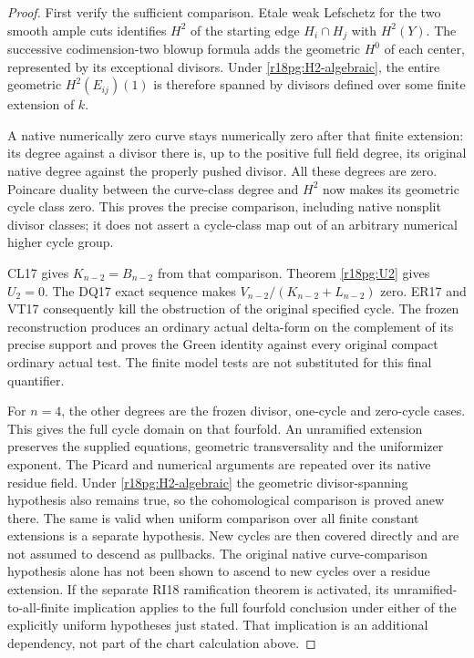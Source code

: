 \begin{proof}
First verify the sufficient comparison.  Etale weak Lefschetz for
the two smooth ample cuts identifies $H^2$ of the starting edge
$H_i\cap H_j$ with $H^2(Y)$.  The successive codimension-two
blowup formula adds the geometric $H^0$ of each center, represented
by its exceptional divisors.  Under \eqref{r18pg:H2-algebraic},
the entire geometric $H^2(E_{ij})(1)$ is therefore spanned by
divisors defined over some finite extension of $k$.

A native numerically zero curve stays numerically zero after that
finite extension: its degree against a divisor there is, up to the
positive full field degree, its original native degree against the
properly pushed divisor.  All these degrees are zero.  Poincare
duality between the curve-class degree and $H^2$ now makes its
geometric cycle class zero.  This proves the precise comparison,
including native nonsplit divisor classes; it does not assert a
cycle-class map out of an arbitrary numerical higher cycle group.

CL17 gives $K_{n-2}=B_{n-2}$ from that comparison.  Theorem
\ref{r18pg:U2} gives $U_2=0$.  The DQ17 exact sequence makes
$V_{n-2}/(K_{n-2}+L_{n-2})$ zero.  ER17 and VT17 consequently
kill the obstruction of the original specified cycle.  The frozen
reconstruction produces an ordinary actual delta-form on the
complement of its precise support and proves the Green identity
against every original compact ordinary actual test.  The finite
model tests are not substituted for this final quantifier.

For $n=4$, the other degrees are the frozen divisor, one-cycle and
zero-cycle cases.  This gives the full cycle domain on that fourfold.
An unramified extension preserves the supplied equations, geometric
transversality and the uniformizer exponent.  The Picard and numerical
arguments are repeated over its native residue field.  Under
\eqref{r18pg:H2-algebraic} the geometric divisor-spanning hypothesis
also remains true, so the cohomological comparison is proved anew
there.  The same is valid when uniform comparison over all finite
constant extensions is a separate hypothesis.  New cycles are then
covered directly and are not assumed to descend as pullbacks.
The original native curve-comparison hypothesis alone has not been
shown to ascend to new cycles over a residue extension.  If the
separate RI18 ramification theorem is activated, its
unramified-to-all-finite implication applies to the full fourfold
conclusion under either of the explicitly uniform hypotheses just
stated.  That implication is an additional dependency, not part of
the chart calculation above.
\end{proof}

